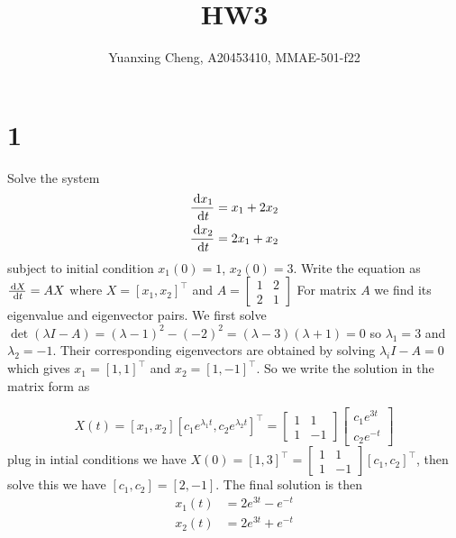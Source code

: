 \documentclass{article}
\title{HW3}
\author{Yuanxing Cheng, A20453410, MMAE-501-f22}
\begin{document}
\maketitle

\section*{1}


\begin{myleftlinebox}
    Solve the system 
    \begin{align*}
        \frac{\,\mathrm{d} x_1}{\,\mathrm{d} t} = x_1 + 2 x_2\\
        \frac{\,\mathrm{d} x_2}{\,\mathrm{d} t} = 2 x_1 + x_2
    \end{align*}
    subject to initial condition \(x_1(0) = 1\), \(x_2(0) = 3\).
    \tcblower
    Write the equation as \(\frac{\,\mathrm{d} X}{\,\mathrm{d} t} = AX\) where \(X = [x_1,x_2]^\top\) and \(A = \begin{bmatrix}
        1 & 2 \\
        2 & 1
    \end{bmatrix}\)
    For matrix \(A\) we find its eigenvalue and eigenvector pairs. We first solve \(\det (\lambda I-A) = (\lambda-1)^2-(-2)^2 = (\lambda-3)(\lambda+1)=0\) so \(\lambda_1 = 3\) and \(\lambda_2 = -1\). Their corresponding eigenvectors are obtained by solving \(\lambda_i I-A=0\) which gives \(x_1 = [1, 1]^\top\) and \(x_2 = [1,-1]^\top\). So we write the solution in the matrix form as

    \begin{equation*}
        X(t) = [x_1,x_2][c_1 e^{\lambda_1 t}, c_2 e^{\lambda_2 t}]^\top = \begin{bmatrix}
            1 & 1\\
            1 & -1
        \end{bmatrix}\begin{bmatrix}
            c_1 e^{3 t}\\
            c_2 e^{-t}
        \end{bmatrix}
    \end{equation*}
    plug in intial conditions we have \(X(0) = [1,3]^\top = \begin{bmatrix}
        1 & 1\\
        1 & -1
    \end{bmatrix}[c_1,c_2]^\top\), then solve this we have \([c_1,c_2]=[2,-1]\). The final solution is then 
    \begin{align*}
        x_1(t) &= 2 e^{3t} - e^{-t}\\
        x_2(t) &= 2 e^{3t} + e^{-t}
    \end{align*}
\end{myleftlinebox}
\end{document}
